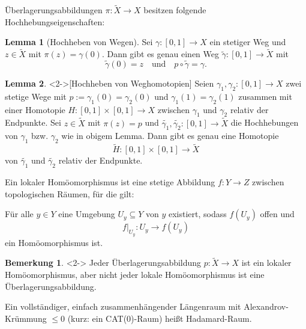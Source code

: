 \documentclass{beamer}
\newcommand{\R}{\mathbb{R}} %
\newcommand{\I}{\left[0,1\right]} %
\renewcommand{\emph}[1]{\textcolor{Emph}{#1}}
\theoremstyle{definition}
\newtheorem*{lem}{Lemma}
\newtheorem*{bem}{Bemerkung}
\begin{document}

\begin{frame}
  Überlagerungsabbildungen $\pi : \tilde{X} \to X$ besitzen folgende Hochhebungseigenschaften:

  \begin{lem}[Hochheben von Wegen]
    Sei $\gamma : \I \to X$ ein stetiger Weg und $z \in \tilde{X}$ mit $\pi(z) = \gamma(0)$.
    Dann gibt es genau einen Weg $\tilde{\gamma} : \I \to \tilde{X}$ mit
    \[
      \tilde{\gamma}(0) = z
      \quad \text{und} \quad
      p \circ \tilde{\gamma} = \gamma.
    \]
  \end{lem}

  \begin{lem}<2->[Hochheben von Weghomotopien]
    Seien $\gamma_1, \gamma_2 : \I \to X$ zwei stetige Wege mit $p := \gamma_1(0) = \gamma_2(0)$ und $\gamma_1(1) = \gamma_2(1)$ zusammen mit einer Homotopie $H : \I \times \I \to X$ zwischen $\gamma_1$ und $\gamma_2$ relativ der Endpunkte. Sei $z \in \tilde{X}$ mit $\pi(z) = p$ und $\tilde{\gamma_1}, \tilde{\gamma_2} : \I \to \tilde{X}$ die Hochhebungen von $\gamma_1$ bzw. $\gamma_2$ wie in obigem Lemma. Dann gibt es genau eine Homotopie
    \[ \tilde{H} : \I \times \I \to \tilde{X} \]
    von $\tilde{\gamma_1}$ und $\tilde{\gamma_2}$ relativ der Endpunkte.
  \end{lem}
\end{frame}

\begin{frame}
  \begin{definition}
    Ein \emph{lokaler Homöomorphismus} ist eine stetige Abbildung $f : Y \to Z$ zwischen topologischen Räumen, für die gilt:

    Für alle $y \in Y$ eine Umgebung $U_y \subseteq Y$ von $y$ existiert, sodass $f(U_y)$ offen und
    \[ f|_{U_y} : U_y \to f(U_y) \]
    ein Homöomorphismus ist.
  \end{definition}

  \begin{bem}<2->
    Jeder Überlagerungsabbildung $p : \tilde{X} \to X$ ist ein lokaler Homöomorphismus, aber nicht jeder lokale Homöomorphismus ist eine Überlagerungsabbildung.
  \end{bem}
\end{frame}

\begin{frame}
  \begin{definition}
    Ein vollständiger, einfach zusammenhängender Längenraum mit Alexandrov-Krümmung $\leq 0$ (kurz: ein CAT($0$)-Raum) heißt \emph{Hadamard-Raum}.
  \end{definition}
\end{frame}
\end{document}
